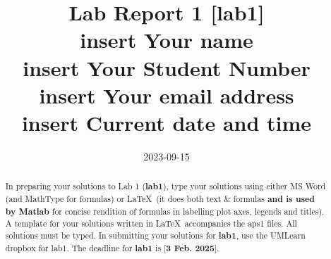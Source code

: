 \documentclass{amsart}
\begin{document}
\title[aps1]{Lab Report 1 [{\bf lab1}]\\
insert Your name\\
insert Your Student Number\\
insert Your email address\\
insert Current date and time}


\date{2023-09-15}

\begin{abstract}
In preparing your solutions to Lab 1 (\colorbox{green!15}{\bf lab1}), type your solutions using either MS Word (and MathType for formulas) or \LaTeX\ (it does both text \& formulas \colorbox{red!15}{\bf and is used by Matlab} for concise rendition of formulas in labelling plot axes, legends and titles).  A template for your solutions written in \LaTeX\  accompanies the aps1 files.  All solutions must be typed.   In submitting your solutions for {\bf lab1}, use the UMLearn dropbox for lab1.
The deadline for {\bf lab1} is [\colorbox{magenta!15}{\bf 3 Feb. 2025}].  
\end{abstract}

\maketitle


\tableofcontents
\thispagestyle{empty}
\end{document}

